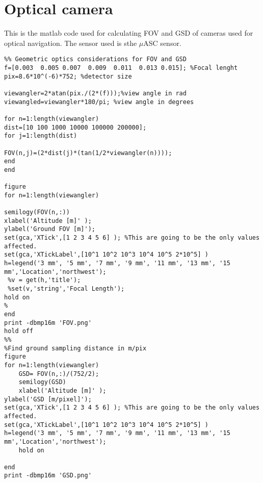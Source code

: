 \chapter{Optical camera}\label{app:majamatlab}

This is the matlab code used for calculating FOV and GSD of cameras used for optical navigation. The sensor used is sthe $\mu$ASC sensor. 

\begin{lstlisting}
%% Geometric optics considerations for FOV and GSD 
f=[0.003  0.005 0.007  0.009  0.011  0.013 0.015]; %Focal lenght
pix=8.6*10^(-6)*752; %detector size

viewangler=2*atan(pix./(2*(f)));%view angle in rad
viewangled=viewangler*180/pi; %view angle in degrees

for n=1:length(viewangler)
dist=[10 100 1000 10000 100000 200000];
for j=1:length(dist)

FOV(n,j)=(2*dist(j)*(tan(1/2*viewangler(n))));
end 
end 

figure
for n=1:length(viewangler)

semilogy(FOV(n,:))
xlabel('Altitude [m]' );
ylabel('Ground FOV [m]');
set(gca,'XTick',[1 2 3 4 5 6] ); %This are going to be the only values affected.
set(gca,'XTickLabel',[10^1 10^2 10^3 10^4 10^5 2*10^5] )
h=legend('3 mm', '5 mm', '7 mm', '9 mm', '11 mm', '13 mm', '15 mm','Location','northwest');
 %v = get(h,'title');
 %set(v,'string','Focal Length');
hold on
%
end 
print -dbmp16m 'FOV.png'
hold off
%%
%Find ground sampling distance in m/pix
figure
for n=1:length(viewangler)
    GSD= FOV(n,:)/(752/2); 
    semilogy(GSD)
    xlabel('Altitude [m]' );
ylabel('GSD [m/pixel]');
set(gca,'XTick',[1 2 3 4 5 6] ); %This are going to be the only values affected.
set(gca,'XTickLabel',[10^1 10^2 10^3 10^4 10^5 2*10^5] )
h=legend('3 mm', '5 mm', '7 mm', '9 mm', '11 mm', '13 mm', '15 mm','Location','northwest');
    hold on 
    
end
print -dbmp16m 'GSD.png'

\end{lstlisting}

